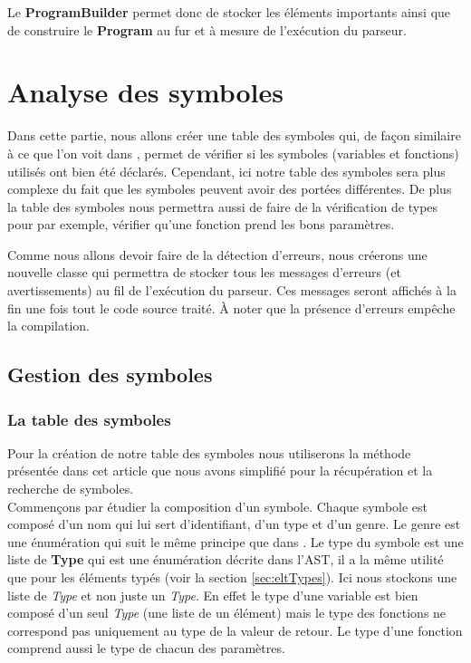 \documentclass[a4paper]{article}%
\begin{document}
Le \textbf{ProgramBuilder} permet donc de stocker les éléments importants ainsi
que de construire le \textbf{Program} au fur et à mesure de l'exécution du
parseur.


\section{Analyse des symboles}

Dans cette partie, nous allons créer une table des symboles qui, de façon
similaire à ce que l'on voit dans \cite{compilerFlexBison}, permet de vérifier
si les symboles (variables et fonctions) utilisés ont bien été déclarés.
Cependant, ici notre table des symboles sera plus complexe du fait que les
symboles peuvent avoir des portées différentes. De plus la table des symboles
nous permettra aussi de faire de la vérification de types pour par exemple,
vérifier qu'une fonction prend les bons paramètres.

Comme nous allons devoir faire de la détection d'erreurs, nous créerons une
nouvelle classe qui permettra de stocker tous les messages d'erreurs (et
avertissements) au fil de l'exécution du parseur. Ces messages seront affichés à
la fin une fois tout le code source traité. À noter que la présence d'erreurs
empêche la compilation.

\subsection{Gestion des symboles}

\subsubsection*{La table des symboles}

Pour la création de notre table des symboles nous utiliserons la méthode
présentée dans cet article \cite{power2000symbol} que nous avons simplifié pour
la récupération et la recherche de symboles.\\

Commençons par étudier la composition d'un symbole. Chaque symbole est composé
d'un nom qui lui sert d'identifiant, d'un type et d'un genre. Le genre est une
énumération qui suit le même principe que dans \cite{power2000symbol}. Le type
du symbole est une liste de \textbf{Type} qui est une énumération décrite dans
l'AST, il a la même utilité que pour les éléments typés (voir la section
\ref{sec:eltTypes}). Ici nous stockons une liste de \textit{Type} et non
juste un \textit{Type}. En effet le type d'une variable est bien composé d'un
seul \textit{Type} (une liste de un élément) mais le type des fonctions ne
correspond pas uniquement au type de la valeur de retour. Le type d'une fonction
comprend aussi le type de chacun des paramètres.
\end{document}
